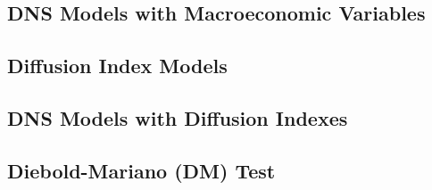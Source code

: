 \subsection{DNS Models with Macroeconomic Variables}
\label{sec:dnsmv}

\subsection{Diffusion Index Models}
\label{sec:dif}

\subsection{DNS Models with Diffusion Indexes}
\label{sec:dnsdif}

\subsection{Diebold-Mariano (DM) Test}
\label{sec:dmtest}
